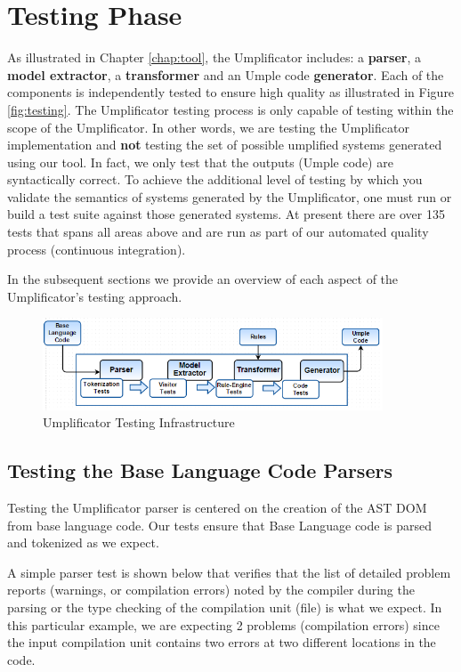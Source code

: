 \section{Testing Phase}

As illustrated in Chapter \ref{chap:tool}, the Umplificator includes: a \textbf{parser}, a \textbf{model extractor}, a \textbf{transformer} and an Umple code \textbf{generator}. Each of the components is independently tested to ensure high quality as illustrated in Figure \ref{fig:testing}. The Umplificator testing process is only capable of testing within the scope of the Umplificator. In other words, we are testing the Umplificator implementation and \textbf{not} testing the set of possible umplified systems generated using our tool. In fact, we only test that the outputs (Umple code) are syntactically correct. To achieve the additional level of testing by which you validate the semantics of systems generated by the Umplificator, one must run or build a test suite against those generated systems. At present there are over 135 tests that spans all areas above and are run as part of our automated quality process (continuous integration).

In the subsequent sections we provide an overview of each aspect of the Umplificator's testing approach. 

\begin{figure}[h]
\centering
\includegraphics[width=0.9\textwidth]{Figures/testingPhase.png} 
\caption{Umplificator Testing Infrastructure}
\label{fig:testingPhase}
\end{figure}


\subsection{Testing the Base Language Code Parsers}

Testing the Umplificator parser is centered on the creation of the AST DOM from base language code. Our tests ensure that Base Language code is parsed and tokenized as we expect.

A simple parser test is shown below that verifies that the list of detailed problem reports (warnings, or compilation errors) noted by the compiler during the parsing or the type checking of the compilation unit (file) is what we expect.
In this particular example, we are expecting 2 problems (compilation errors) since the input compilation unit contains two errors at two different locations in the code.


